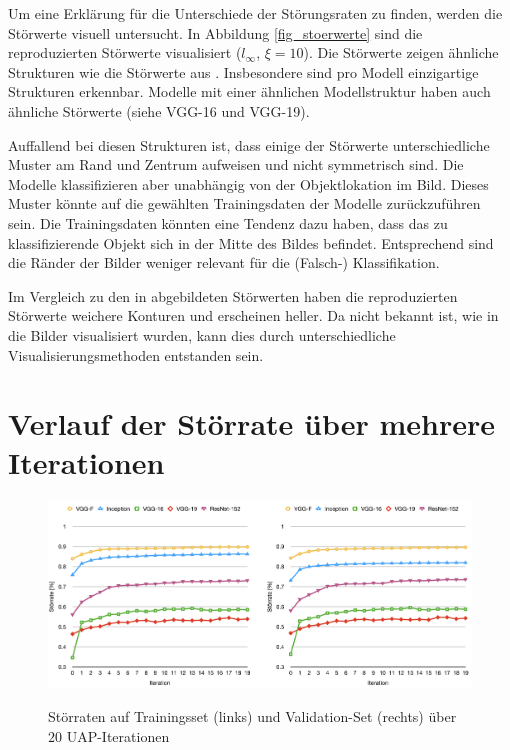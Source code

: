 \documentclass{FFHS_Thesis_Additions/ffhsthesis}
\begin{document}
Um eine Erklärung für die Unterschiede der Störungsraten zu finden, werden die Störwerte visuell untersucht. 
In Abbildung \ref{fig_stoerwerte} sind die reproduzierten Störwerte visualisiert ($l_\infty$, $\xi=10$). 
Die Störwerte zeigen ähnliche Strukturen wie die Störwerte aus \cite{moosavi-dezfooli_universal_2017-1}. 
Insbesondere sind pro Modell einzigartige Strukturen erkennbar. 
Modelle mit einer ähnlichen Modellstruktur haben auch ähnliche Störwerte (siehe VGG-16 und VGG-19).

Auffallend bei diesen Strukturen ist, dass einige der Störwerte unterschiedliche Muster am Rand und Zentrum aufweisen und nicht symmetrisch sind. Die Modelle klassifizieren aber unabhängig von der Objektlokation im Bild. Dieses Muster könnte auf die gewählten Trainingsdaten der Modelle zurückzuführen sein. Die Trainingsdaten könnten eine Tendenz dazu haben, dass das zu klassifizierende Objekt sich in der Mitte des Bildes befindet. Entsprechend sind die Ränder der Bilder weniger relevant für die (Falsch-) Klassifikation.

Im Vergleich zu den in \cite{moosavi-dezfooli_universal_2017-1} abgebildeten Störwerten haben die reproduzierten Störwerte weichere Konturen und erscheinen heller. 
Da nicht bekannt ist, wie in \cite{moosavi-dezfooli_universal_2017-1} die Bilder visualisiert wurden, kann dies durch unterschiedliche Visualisierungsmethoden entstanden sein.



\section{Verlauf der Störrate über mehrere Iterationen}

\begin{figure}[h]
\caption{Störraten auf Trainingsset (links) und Validation-Set (rechts) über $20$ UAP-Iterationen}
\centering
\includegraphics[width=\textwidth]{./images/stoerraten_training.png}
\label{fig_stoerrate_iterationen}
\end{figure}
\end{document}
